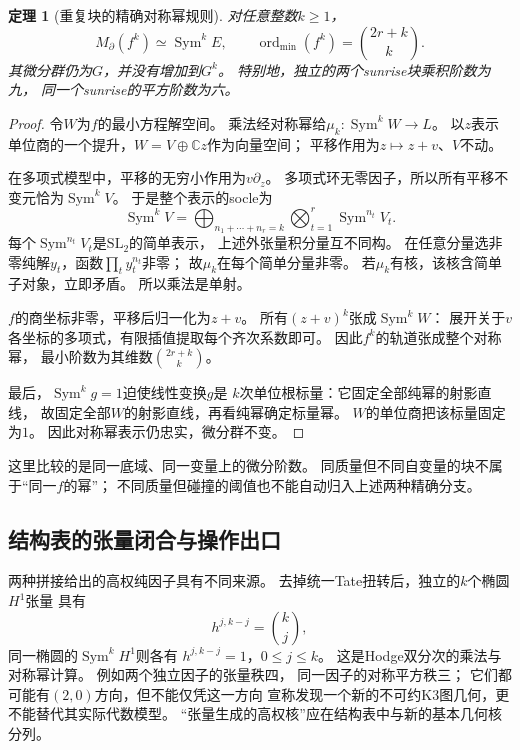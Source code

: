 \documentclass[11pt,a4paper]{ctexart}
\theoremstyle{cnplain}\newtheorem{theorem}{定理}[section]
\theoremstyle{definition}\newtheorem{definition}[theorem]{定义}
\theoremstyle{remark}\newtheorem{remark}[theorem]{注}
\begin{document}
\begin{theorem}[重复块的精确对称幂规则]\label{thm:repeatedblock}
对任意整数$k\ge1$，
\[
 M_\partial(f^k)\simeq\operatorname{Sym}^kE,\qquad
 \operatorname{ord}_{\min}(f^k)=\binom{2r+k}{k}.
\]
其微分群仍为$G$，并没有增加到$G^k$。
特别地，独立的两个sunrise块乘积阶数为九，
同一个sunrise的平方阶数为六。
\end{theorem}
\begin{proof}
令$W$为$f$的最小方程解空间。
乘法经对称幂给$\mu_k:\operatorname{Sym}^kW\to L$。
以$z$表示单位商的一个提升，$W=V\oplus\mathbb Cz$作为向量空间；
平移作用为$z\mapsto z+v$、$V$不动。

在多项式模型中，平移的无穷小作用为$v\partial_z$。
多项式环无零因子，所以所有平移不变元恰为$\operatorname{Sym}^kV$。
于是整个表示的socle为
\[
 \operatorname{Sym}^kV=
 \bigoplus_{n_1+\cdots+n_r=k}
       \bigotimes_{t=1}^r\operatorname{Sym}^{n_t}V_t .
\]
每个$\operatorname{Sym}^{n_t}V_t$是$\mathrm{SL}_2$的简单表示，
上述外张量积分量互不同构。
在任意分量选非零纯解$y_t$，函数$\prod_ty_t^{n_t}$非零；
故$\mu_k$在每个简单分量非零。
若$\mu_k$有核，该核含简单子对象，立即矛盾。
所以乘法是单射。

$f$的商坐标非零，平移后归一化为$z+v$。
所有$(z+v)^k$张成$\operatorname{Sym}^kW$：
展开关于$v$各坐标的多项式，有限插值提取每个齐次系数即可。
因此$f^k$的轨道张成整个对称幂，
最小阶数为其维数$\binom{2r+k}{k}$。

最后，$\operatorname{Sym}^k g=1$迫使线性变换$g$是
$k$次单位根标量：它固定全部纯幂的射影直线，
故固定全部$W$的射影直线，再看纯幂确定标量幂。
$W$的单位商把该标量固定为$1$。
因此对称幂表示仍忠实，微分群不变。
\end{proof}

这里比较的是同一底域、同一变量上的微分阶数。
同质量但不同自变量的块不属于“同一$f$的幂”；
不同质量但碰撞的阈值也不能自动归入上述两种精确分支。

\subsection{结构表的张量闭合与操作出口}
两种拼接给出的高权纯因子具有不同来源。
去掉统一Tate扭转后，独立的$k$个椭圆$H^1$张量
具有
\[
 h^{j,k-j}=\binom{k}{j},
\]
同一椭圆的$\operatorname{Sym}^kH^1$则各有
$h^{j,k-j}=1$，$0\le j\le k$。
这是Hodge双分次的乘法与对称幂计算。
例如两个独立因子的张量秩四，
同一因子的对称平方秩三；
它们都可能有$(2,0)$方向，但不能仅凭这一方向
宣称发现一个新的不可约K3图几何，更不能替代其实际代数模型。
“张量生成的高权核”应在结构表中与新的基本几何核分列。
\end{document}
